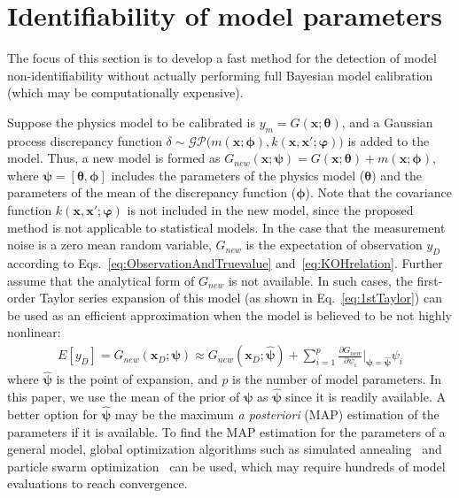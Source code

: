 \documentclass[preprint,review,12pt,3p]{elsarticle}
\begin{document}
\section{Identifiability of model parameters}\label{section:identifiability}

The focus of this section is to develop a fast method for the detection of model non-identifiability without actually performing full Bayesian model calibration (which may be computationally expensive).

Suppose the physics model to be calibrated is $y_m=G(\boldsymbol{x};\boldsymbol{\theta})$, and a Gaussian process discrepancy function $\delta \sim \mathcal{GP} \big( m(\boldsymbol{x};\boldsymbol{\phi}), k(\boldsymbol{x},\boldsymbol{x}'; \boldsymbol{\varphi}) \big)$ is added to the model. Thus, a new model is formed as $G_{new}(\boldsymbol{x};\boldsymbol{\psi})=G(\boldsymbol{x};\boldsymbol{\theta})+m(\boldsymbol{x};\boldsymbol{\phi})$, where $\boldsymbol{\psi}=[\boldsymbol{\theta},\boldsymbol{\phi}]$ includes the parameters of the physics model ($\boldsymbol{\theta}$) and the parameters of the mean of the discrepancy function ($\boldsymbol{\phi}$). Note that the covariance function $k(\boldsymbol{x},\boldsymbol{x}'; \boldsymbol{\varphi})$ is not included in the new model, since the proposed method is not applicable to statistical models. In the case that the measurement noise is a zero mean random variable, $G_{new}$ is the expectation of observation $y_D$ according to Eqs.~\ref{eq:ObservationAndTruevalue} and~\ref{eq:KOHrelation}. Further assume that the analytical form of $G_{new}$ is not available. In such cases, the first-order Taylor series expansion of this model (as shown in Eq.~\ref{eq:1stTaylor}) can be used as an efficient approximation when the model is believed to be not highly nonlinear:
\begin{eqnarray}\label{eq:1stTaylor}
E[y_D] = G_{new}(\boldsymbol{x}_D;\boldsymbol{\psi}) \approx G_{new}(\boldsymbol{x}_D;\hat{\boldsymbol{\psi}}) + \sum_{i=1}^{p} \frac{\partial{G_{new}}}{\partial{\psi_i}} \bigg|_{\boldsymbol{\psi}=\hat{\boldsymbol{\psi}}} \psi_i
\end{eqnarray} 
where $\hat{\boldsymbol{\psi}}$ is the point of expansion, and $p$ is the number of model parameters. In this paper, we use the mean of the prior of $\boldsymbol{\psi}$ as $\hat{\boldsymbol{\psi}}$ since it is readily available. A better option for $\hat{\boldsymbol{\psi}}$ may be the maximum \textit{a posteriori} (MAP) estimation of the parameters if it is available. To find the MAP estimation for the parameters of a general model, global optimization algorithms such as simulated annealing~\citep{Kirkpatrick1983} and particle swarm optimization~\citep{Kennedy1995} can be used, which may require hundreds of model evaluations to reach convergence.
\end{document}
